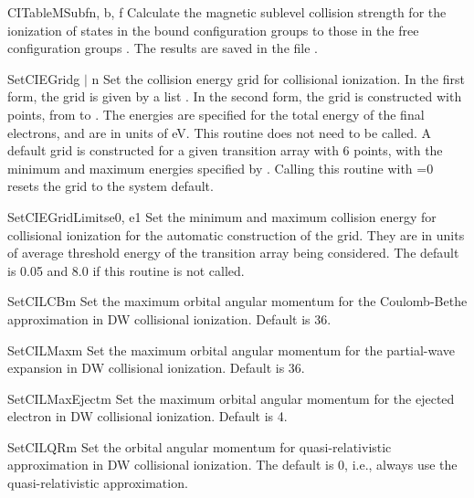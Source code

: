 \begin{fundesc}{CITableMSub}{fn, b, f}
Calculate the magnetic sublevel collision strength for the ionization of
states in the bound configuration groups  to those in the free
configuration groups . The results are saved in the file .
\end{fundesc}

\begin{fundesc}{SetCIEGrid}{g $\mid$ n}
Set the collision energy grid for collisional ionization. In the first form, the
grid is given by a list . In the second form, the grid is constructed
with  points, from  to . The energies are specified for
the total energy of the final electrons, and are in units of eV. This routine
does not need to be called. A default grid is constructed for a given transition
array with 6 points, with the minimum and maximum energies specified by
. Calling this routine with =0 resets the grid
to the system default.
\end{fundesc}

\begin{fundesc}{SetCIEGridLimits}{e0, e1}
Set the minimum and maximum collision energy for collisional ionization for
the automatic construction of the grid. They are in units of average threshold
energy of the transition array being considered. The default is 0.05 and 8.0
if this routine is not called.
\end{fundesc}

\begin{fundesc}{SetCILCB}{m}
Set the maximum orbital angular momentum for the Coulomb-Bethe approximation in
DW collisional ionization. Default is 36.
\end{fundesc}

\begin{fundesc}{SetCILMax}{m}
Set the maximum orbital angular momentum for the partial-wave expansion in DW
collisional ionization. Default is 36.
\end{fundesc}

\begin{fundesc}{SetCILMaxEject}{m}
Set the maximum orbital angular momentum for the ejected electron in DW
collisional ionization. Default is 4.
\end{fundesc}

\begin{fundesc}{SetCILQR}{m}
Set the orbital angular momentum for quasi-relativistic approximation in DW
collisional ionization. The default is 0, i.e., always use the
quasi-relativistic approximation.
\end{fundesc}

